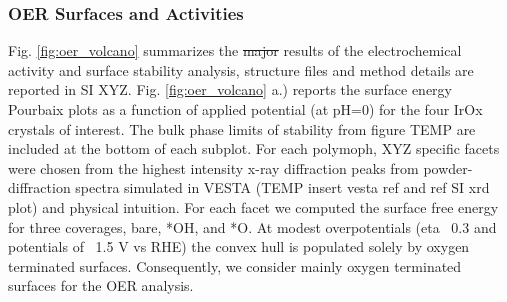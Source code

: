

\subsubsection{OER Surfaces and Activities}

Fig. \ref{fig:oer_volcano} summarizes the \sout{major} results of the electrochemical activity and surface stability analysis, structure files and method details are reported in SI XYZ.
%
Fig. \ref{fig:oer_volcano} a.) reports the surface energy Pourbaix plots as a function of applied potential (at pH=0) for the four IrOx crystals of interest.
%
The bulk phase limits of stability from figure TEMP are included at the bottom of each subplot.
%
For each polymoph, XYZ specific facets were chosen from the highest intensity x-ray diffraction peaks from powder-diffraction spectra simulated in VESTA (TEMP insert vesta ref and ref SI xrd plot) and physical intuition.
%
For each facet we computed the surface free energy for three coverages, bare, *OH, and *O.
%
At modest overpotentials (eta ~0.3 and potentials of ~1.5 V vs RHE) the convex hull is populated solely by oxygen terminated surfaces.
%
Consequently, we consider mainly oxygen terminated surfaces for the OER analysis.


